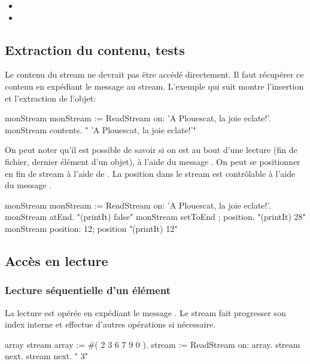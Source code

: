 \begin{itemize}
\item {}
\item {}
\end{itemize}

\subsection{Extraction du contenu, tests}

Le contenu du stream ne devrait pas \^etre acc\'ed\'e directement.
Il faut r\'ecup\'erer ce contenu en exp\'ediant le message
 au stream. L'exemple qui suit montre l'insertion
et l'extraction de l'objet:

\begin{scode}
\stBar monStream \stBar
monStream := ReadStream on: 'A Plouescat, la joie eclate!'.
monStream contents.   " 'A Plouescat, la joie eclate!'"
\end{scode}

On peut noter qu'il est possible de savoir si on est au bout d'une lecture
(fin de fichier, dernier \'el\'ement d'un objet), \`a l'aide du message .
On peut se positionner en fin de stream \`a l'aide de .
La position dans le stream est contr\^olable \`a l'aide du message .

\begin{scode}
\stBar monStream \stBar
monStream := ReadStream on: 'A Plouescat, la joie eclate!'.
monStream atEnd. "(printIt) false"
monStream setToEnd ; position. "(printIt) 28"
monStream  position: 12; position "(printIt) 12"
\end{scode}

\subsection{Acc\`es en lecture}

\subsubsection{Lecture s\'equentielle d'un \'el\'ement}
La lecture est op\'er\'ee en exp\'ediant le message .
Le stream fait progresser son index interne et effectue d'autres
op\'erations si n\'ecessaire.

\begin{scode}
\stBar array stream \stBar
array := #( 2  3 6 7 9 0 ).
stream := ReadStream on: array.
stream next. stream next. " 3"
\end{scode}

